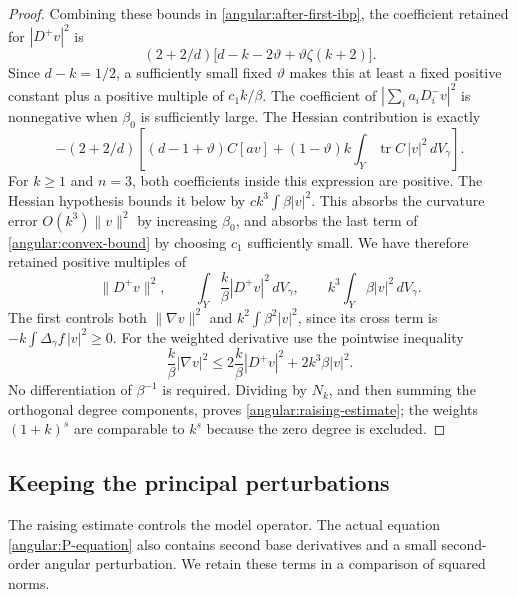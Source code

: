 \documentclass[11pt,a4paper]{article}
\DeclareMathOperator{\tr}{tr}
\numberwithin{equation}{section}
\begin{document}
\begin{proof}
Combining these bounds in \eqref{angular:after-first-ibp}, the coefficient
retained for $|D^+v|^2$ is
\begin{equation}\label{angular:positive-degree-factor}
 (2+2/d)\bigl[d-k-2\vartheta
                         +\vartheta\zeta(k+2)\bigr].
\end{equation}
Since $d-k=1/2$, a sufficiently small fixed $\vartheta$ makes this
at least a fixed positive constant plus a positive multiple of
$c_1k/\beta$.  The coefficient of
$|\sum_i a_iD_i^-v|^2$ is nonnegative when $\beta_0$ is sufficiently
large.  The Hessian contribution is exactly
\begin{equation}\label{angular:hessian-contribution}
 -(2+2/d)\left[(d-1+\vartheta)C[av]
       +(1-\vartheta)k\int_Y\tr C\,|v|^2\,dV_\gamma\right].
\end{equation}
For $k\ge1$ and $n=3$, both coefficients inside this expression are
positive.  The Hessian hypothesis bounds it below by
$c k^3\int\beta|v|^2$.  This absorbs the curvature error $O(k^3)\|v\|^2$
by increasing $\beta_0$, and absorbs the last term of
\eqref{angular:convex-bound} by choosing $c_1$ sufficiently small.
We have therefore retained positive multiples of
\[
 \|D^+v\|^2,\qquad
 \int_Y\frac{k}{\beta}|D^+v|^2\,dV_\gamma,
 \qquad k^3\int_Y\beta|v|^2\,dV_\gamma.
\]
The first controls both $\|\nabla v\|^2$ and
$k^2\int\beta^2|v|^2$, since its cross term is
$-k\int\Delta_\gamma f\,|v|^2\ge0$.  For the weighted derivative use the
pointwise inequality
\[
 \frac{k}{\beta}|\nabla v|^2
 \le2\frac{k}{\beta}|D^+v|^2+2k^3\beta|v|^2.
\]
No differentiation of $\beta^{-1}$ is required.  Dividing by $N_k$, and
then summing the orthogonal degree components, proves
\eqref{angular:raising-estimate}; the weights $(1+k)^s$ are comparable
to $k^s$ because the zero degree is excluded.
\end{proof}

\subsection{Keeping the principal perturbations}

The raising estimate controls the model operator.  The actual equation
\eqref{angular:P-equation} also contains second base derivatives and a
small second-order angular perturbation.  We retain these terms in a
comparison of squared norms.
\end{document}
